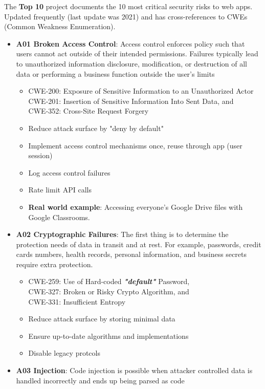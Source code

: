 \documentclass[11pt]{article}
\begin{document}
The \textbf{Top 10} project documents the 10 most critical security risks to web apps. Updated frequently (last update was 2021) and has cross-references to CWEs (Common Weakness Enumeration).

\begin{itemize}
	\item \textbf{A01 Broken Access Control}: Access control enforces policy such that users cannot act outside of their intended permissions. Failures typically lead to unauthorized information disclosure, modification, or destruction of all data or performing a business function outside the user's limits
		\begin{itemize}
			\item CWE-200: Exposure of Sensitive Information to an Unauthorized Actor \\
			  CWE-201: Insertion of Sensitive Information Into Sent Data, and \\
			  CWE-352: Cross-Site Request Forgery
			\item Reduce attack surface by "deny by default"
			\item Implement access control mechanisms once, reuse through app (user session)
			\item Log access control failures
			\item Rate limit API calls
			\item \textbf{Real world example}: Accessing everyone's Google Drive files with Google Classrooms. 
		\end{itemize}
	\item \textbf{A02 Cryptographic Failures}: The first thing is to determine the protection needs of data in transit and at rest. For example, passwords, credit cards numbers, health records, personal information, and business secrets require extra protection.
		\begin{itemize}
			\item CWE-259: Use of Hard-coded \textbf{\textit{"default"}} Password, \\
			  CWE-327: Broken or Risky Crypto Algorithm, and \\
			  CWE-331: Insufficient Entropy
			\item Reduce attack surface by storing minimal data
			\item Ensure up-to-date algorithms and implementations
			\item Disable legacy protcols
		\end{itemize}
	\item \textbf{A03 Injection}: Code injection is possible when attacker controlled data is handled incorrectly and ends up being parsed as code

\end{itemize}
\end{document}
